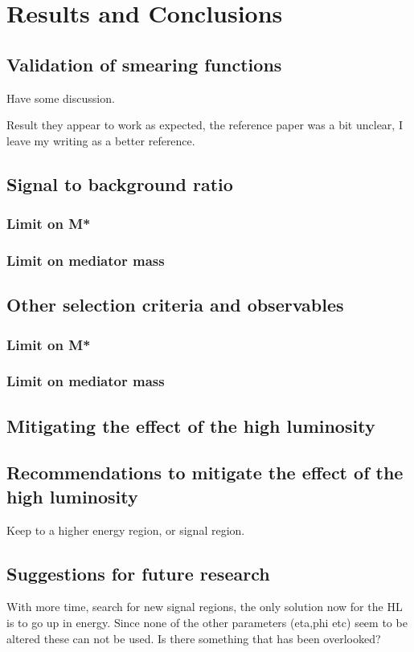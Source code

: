 \chapter{Results and Conclusions}\label{cha:res}
\section{Validation of smearing functions}
Have some discussion.

Result they appear to work as expected, the reference paper was a bit unclear, I leave my writing as a better reference.

\section{Signal to background ratio}
\subsection{Limit on M*}
\subsection{Limit on mediator mass}

\section{Other selection criteria and observables}
\subsection{Limit on M*}
\subsection{Limit on mediator mass}
\section{Mitigating the effect of the high luminosity}

\section{Recommendations to mitigate the effect of the high luminosity}
Keep to a higher energy region, or signal region.
\section{Suggestions for future research}
With more time, search for new signal regions, the only solution now for the HL is to go up in energy. Since none of the other parameters (eta,phi etc) seem to be altered these can not be used. Is there something that has been overlooked?


